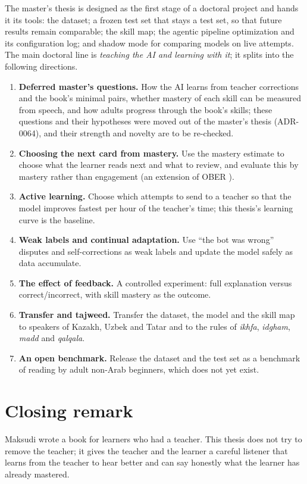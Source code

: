 The master's thesis is designed as the first stage of a doctoral project and hands it its tools: the dataset; a
frozen test set that stays a test set, so that future results remain comparable; the skill map; the agentic pipeline optimization and its configuration log; and shadow mode for comparing models on live attempts. The
main doctoral line is \emph{teaching the AI and learning with it}; it splits into the following directions.
\begin{enumerate}
  \item \textbf{Deferred master's questions.} How the AI learns from teacher corrections and the book's
    minimal pairs, whether mastery of each skill can be measured from speech, and how adults progress through
    the book's skills; these questions and their hypotheses were moved out of the master's thesis (ADR-0064),
    and their strength and novelty are to be re-checked.
  \item \textbf{Choosing the next card from mastery.} Use the mastery estimate to choose what the learner reads
    next and what to review, and evaluate this by mastery rather than engagement (an extension of OBER
    \cite{SRC-134}).
  \item \textbf{Active learning.} Choose which attempts to send to a teacher so that the model improves fastest
    per hour of the teacher's time; this thesis's learning curve is the baseline.
  \item \textbf{Weak labels and continual adaptation.} Use ``the bot was wrong'' disputes and self-corrections as
    weak labels and update the model safely as data accumulate.
  \item \textbf{The effect of feedback.} A controlled experiment: full explanation versus correct/incorrect, with
    skill mastery as the outcome.
  \item \textbf{Transfer and tajweed.} Transfer the dataset, the model and the skill map to speakers of Kazakh,
    Uzbek and Tatar and to the rules of \emph{ikhfa}, \emph{idgham}, \emph{madd} and \emph{qalqala}.
  \item \textbf{An open benchmark.} Release the dataset and the test set as a benchmark of reading by adult
    non-Arab beginners, which does not yet exist.
\end{enumerate}

\section{Closing remark}

Maksudi wrote a book for learners who had a teacher. This thesis does not try to remove the teacher; it gives the
teacher and the learner a careful listener that learns from the teacher to hear better and can say honestly what
the learner has already mastered.
